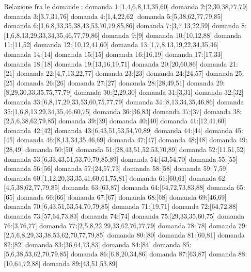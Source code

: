 Relazione fra le domande :
domanda 1:[1,4,6,8,13,35,60]
domanda 2:[2,30,38,77,79]
domanda 3:[3,7,31,76]
domanda 4:[1,4,22,62]
domanda 5:[5,38,62,77,79,85]
domanda 6:[1,6,8,33,35,38,43,53,70,79,85,86]
domanda 7:[3,7,13,22,59]
domanda 8:[1,6,8,13,29,33,34,35,46,77,79,86]
domanda 9:[9]
domanda 10:[10,12,88]
domanda 11:[11,52]
domanda 12:[10,12,41,60]
domanda 13:[1,7,8,13,19,22,34,35,46]
domanda 14:[14]
domanda 15:[15]
domanda 16:[16,19]
domanda 17:[17,33]
domanda 18:[18]
domanda 19:[13,16,19,71]
domanda 20:[20,60,86]
domanda 21:[21]
domanda 22:[4,7,13,22,77]
domanda 23:[23]
domanda 24:[24,57]
domanda 25:[25]
domanda 26:[26]
domanda 27:[27]
domanda 28:[28,49,51]
domanda 29:[8,29,30,33,35,75,77,79]
domanda 30:[2,29,30]
domanda 31:[3,31]
domanda 32:[32]
domanda 33:[6,8,17,29,33,53,60,75,77,79]
domanda 34:[8,13,34,35,46,86]
domanda 35:[1,6,8,13,29,34,35,46,60,75]
domanda 36:[36,83]
domanda 37:[37]
domanda 38:[2,5,6,38,62,79,85]
domanda 39:[39]
domanda 40:[40]
domanda 41:[12,41,60]
domanda 42:[42]
domanda 43:[6,43,51,53,54,70,89]
domanda 44:[44]
domanda 45:[45]
domanda 46:[8,13,34,35,46,69]
domanda 47:[47]
domanda 48:[48]
domanda 49:[28,49]
domanda 50:[50]
domanda 51:[28,43,51,52,53,70,89]
domanda 52:[11,51,52]
domanda 53:[6,33,43,51,53,70,79,85,89]
domanda 54:[43,54,70]
domanda 55:[55]
domanda 56:[56]
domanda 57:[24,57,73]
domanda 58:[58]
domanda 59:[7,59]
domanda 60:[1,12,20,33,35,41,60,61,75,81]
domanda 61:[60,61]
domanda 62:[4,5,38,62,77,79,85]
domanda 63:[63,87]
domanda 64:[64,72,73,83,88]
domanda 65:[65]
domanda 66:[66]
domanda 67:[67]
domanda 68:[68]
domanda 69:[46,69]
domanda 70:[6,43,51,53,54,70,79,85]
domanda 71:[19,71]
domanda 72:[64,72,88]
domanda 73:[57,64,73,83]
domanda 74:[74]
domanda 75:[29,33,35,60,75]
domanda 76:[3,76,77]
domanda 77:[2,5,8,22,29,33,62,76,77,79]
domanda 78:[78]
domanda 79:[2,5,6,8,29,33,38,53,62,70,77,79,85]
domanda 80:[80]
domanda 81:[60,81]
domanda 82:[82]
domanda 83:[36,64,73,83]
domanda 84:[84]
domanda 85:[5,6,38,53,62,70,79,85]
domanda 86:[6,8,20,34,86]
domanda 87:[63,87]
domanda 88:[10,64,72,88]
domanda 89:[43,51,53,89]

